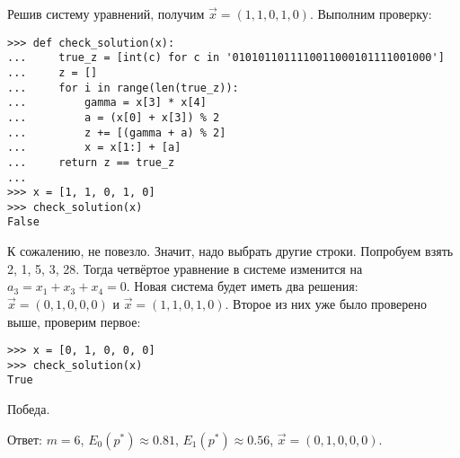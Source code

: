 \documentclass[letterpaper,11pt,openany]{book}
\begin{document}
Решив систему уравнений, получим $\vec{x} = (1, 1, 0, 1, 0)$. Выполним проверку:

\begin{lstlisting}
>>> def check_solution(x):
... 	true_z = [int(c) for c in '0101011011110011000101111001000']
... 	z = []
... 	for i in range(len(true_z)):
... 		gamma = x[3] * x[4]
... 		a = (x[0] + x[3]) % 2
... 		z += [(gamma + a) % 2]
... 		x = x[1:] + [a]
... 	return z == true_z
... 
>>> x = [1, 1, 0, 1, 0]
>>> check_solution(x)
False
\end{lstlisting}

К сожалению, не повезло. Значит, надо выбрать другие строки. Попробуем взять 2, 1, 5, 3, 28. Тогда четвёртое уравнение в системе изменится на $a_3 = x_1 + x_3 + x_4 = 0$. Новая система будет иметь два решения: $\vec{x} = (0, 1, 0, 0, 0)$ и $\vec{x} = (1, 1, 0, 1, 0)$. Второе из них уже было проверено выше, проверим первое:

\begin{lstlisting}
>>> x = [0, 1, 0, 0, 0]
>>> check_solution(x)
True
\end{lstlisting}

Победа.

Ответ: $m = 6$, $E_0 (p^*) \approx 0.81$, $E_1 (p^*) \approx 0.56$, $\vec{x} = (0, 1, 0, 0, 0)$.
\end{document}
